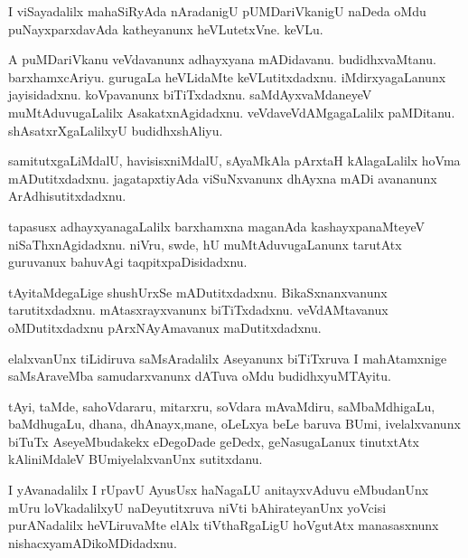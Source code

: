 \documentclass{article}
\begin{document}
\begin{mn}%
I viSayadalilx mahaSiRyAda nAradanigU pUMDariVkanigU naDeda oMdu puNayxparxdavAda katheyanunx 
heVLutetxVne. keVLu.
\end{mn}

\begin{mn}%
A puMDariVkanu veVdavanunx adhayxyana mADidavanu. budidhxvaMtanu. barxhamxcAriyu. gurugaLa 
heVLidaMte keVLutitxdadxnu. iMdirxyagaLanunx jayisidadxnu. koVpavanunx biTiTxdadxnu. 
saMdAyxvaMdaneyeV muMtAduvugaLalilx AsakatxnAgidadxnu. veVdaveVdAMgagaLalilx paMDitanu. 
shAsatxrXgaLalilxyU budidhxshAliyu.
\end{mn}

\begin{mn}%
samitutxgaLiMdalU, havisisxniMdalU, sAyaMkAla pArxtaH kAlagaLalilx hoVma mADutitxdadxnu. 
jagatapxtiyAda viSuNxvanunx dhAyxna mADi avananunx ArAdhisutitxdadxnu.
\end{mn}

\begin{mn}%
tapasusx adhayxyanagaLalilx barxhamxna maganAda kashayxpanaMteyeV niSaThxnAgidadxnu. niVru, swde, 
hU muMtAduvugaLanunx tarutAtx guruvanux bahuvAgi taqpitxpaDisidadxnu.
\end{mn}

\begin{mn}%
tAyitaMdegaLige shushUrxSe mADutitxdadxnu. BikaSxnanxvanunx tarutitxdadxnu. mAtasxrayxvanunx 
biTiTxdadxnu. veVdAMtavanux oMDutitxdadxnu pArxNAyAmavanux maDutitxdadxnu.
\end{mn}

\begin{mn}%
elalxvanUnx tiLidiruva saMsAradalilx Aseyanunx biTiTxruva I mahAtamxnige saMsAraveMba 
samudarxvanunx dATuva oMdu budidhxyuMTAyitu.
\end{mn}

\begin{mn}%
tAyi, taMde, sahoVdararu, mitarxru, soVdara mAvaMdiru, saMbaMdhigaLu, baMdhugaLu, dhana, 
dhAnayx,mane, oLeLxya beLe baruva BUmi, ivelalxvanunx biTuTx AseyeMbudakekx eDegoDade geDedx, 
geNasugaLanux tinutxtAtx kAliniMdaleV BUmiyelalxvanUnx sutitxdanu.
\end{mn}

\begin{mn}%
I yAvanadalilx I rUpavU AyusUsx haNagaLU anitayxvAduvu eMbudanUnx mUru loVkadalilxyU naDeyutitxruva 
niVti bAhirateyanUnx yoVcisi purANadalilx heVLiruvaMte elAlx tiVthaRgaLigU hoVgutAtx manasasxnunx 
nishacxyamADikoMDidadxnu.
\end{mn}
\end{document}
